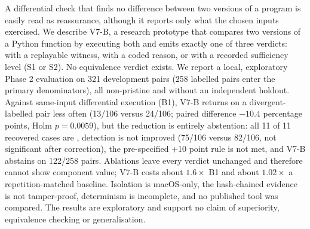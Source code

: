A differential check that finds no difference between two versions of a program is easily read as reassurance, although it reports only what the chosen inputs exercised. We describe V7-B, a research prototype that compares two versions of a Python function by executing both and emits exactly one of three verdicts: \DIV{} with a replayable witness, \INS{} with a coded reason, or \NDO{} with a recorded sufficiency level (S1 or S2). No equivalence verdict exists. We report a local, exploratory Phase 2 evaluation on 321 development pairs (258 labelled pairs enter the primary denominators), all non-pristine and without an independent holdout. Against same-input differential execution (B1), V7-B returns \NDO{} on a divergent-labelled pair less often (13/106 versus 24/106; paired difference $-10.4$ percentage points, Holm $p=0.0059$), but the reduction is entirely abstention: all 11 of 11 recovered cases are \INS{}, detection is not improved (75/106 versus 82/106, not significant after correction), the pre-specified +10 point rule is not met, and V7-B abstains on 122/258 pairs. Ablations leave every verdict unchanged and therefore cannot show component value; V7-B costs about $1.6\times$ B1 and about $1.02\times$ a repetition-matched baseline. Isolation is macOS-only, the hash-chained evidence is not tamper-proof, determinism is incomplete, and no published tool was compared. The results are exploratory and support no claim of superiority, equivalence checking or generalisation.
